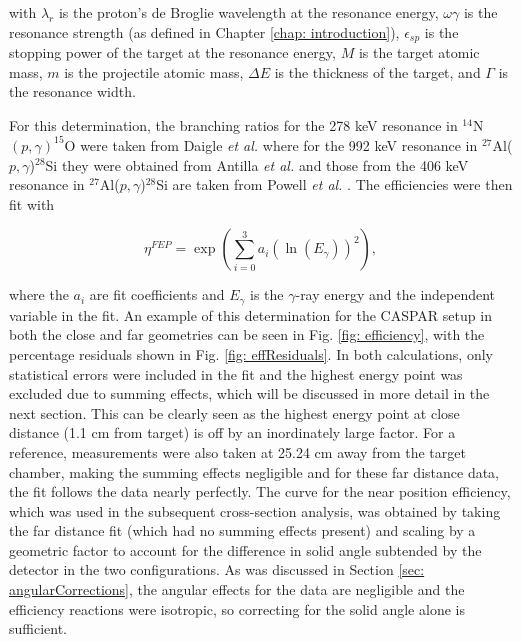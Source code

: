 \noindent with $\lambda_{r}$ is the proton's de Broglie wavelength at the resonance energy, $\omega \gamma$ is the resonance strength (as defined in Chapter \ref{chap: introduction}), $\epsilon_{sp}$ is the stopping power of the target at the resonance energy, $M$ is the target atomic mass, $m$ is the projectile atomic mass, $\Delta E$ is the thickness of the target, and $\Gamma$ is the resonance width. 

For this determination, the branching ratios for the 278 keV resonance in $^{14}$N$\left( p,\gamma \right) ^{15}$O were taken from Daigle \textit{et al.} \cite{Daigle2016} where for the 992 keV resonance in $^{27}$Al($p, \gamma$)$^{28}$Si they were obtained from Antilla \textit{et al.} \cite{Antilla1977} and those from the 406 keV resonance in $^{27}$Al($p, \gamma$)$^{28}$Si are taken from Powell \textit{et al.} \cite{Powell1998}. The efficiencies were then fit with 

\begin{equation}
\eta^{FEP} = \exp \left(  \sum_{i=0}^{3} a_{i} ( \ln (E_{\gamma}))^{2}    \right),
\end{equation}

\noindent where the $a_{i}$ are fit coefficients and $E_{\gamma}$ is the $\gamma$-ray energy and the independent variable in the fit. An example of this determination for the CASPAR setup in both the close and far geometries can be seen in Fig. \ref{fig: efficiency}, with the percentage residuals shown in Fig. \ref{fig: effResiduals}. In both calculations, only statistical errors were included in the fit and the highest energy point was excluded due to summing effects, which will be discussed in more detail in the next section. This can be clearly seen as the highest energy point at close distance (1.1 cm from target) is off by an inordinately large factor. For a reference, measurements were also taken at 25.24 cm away from the target chamber, making the summing effects negligible and for these far distance data, the fit follows the data nearly perfectly. The curve for the near position efficiency, which was used in the subsequent cross-section analysis, was obtained by taking the far distance fit (which had no summing effects present) and scaling by a geometric factor to account for the difference in solid angle subtended by the detector in the two configurations. As was discussed in Section \ref{sec: angularCorrections}, the angular effects for the data are negligible and the efficiency reactions were isotropic, so correcting for the solid angle alone is sufficient. 


